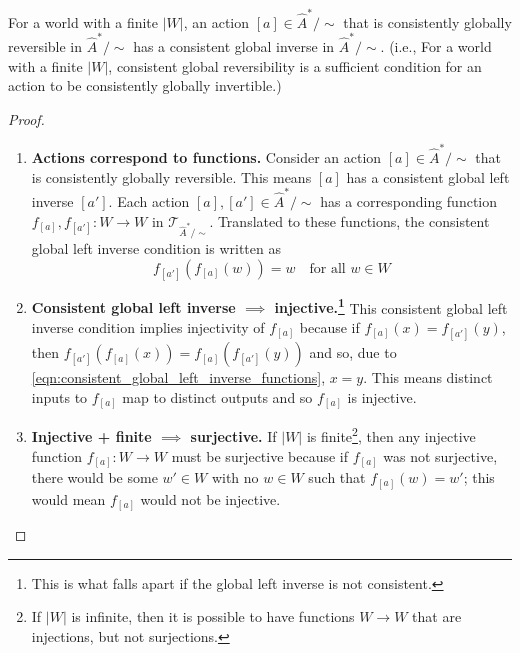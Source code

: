 \begin{proposition}
    For a world with a finite $|W|$, an action $[a] \in \hat{A}^{*}/\sim$ that is consistently globally reversible in $\hat{A}^{*}/\sim$ has a consistent global inverse in $\hat{A}^{*}/\sim$.
    (i.e., For a world with a finite $|W|$, consistent global reversibility is a sufficient condition for an action to be consistently globally invertible.)
\end{proposition}
\begin{proof}
    \begin{enumerate}[(1)]
    \item \textbf{Actions correspond to functions.}
    Consider an action $[a] \in \hat{A}^{*}/\sim$ that is consistently globally reversible.
    This means $[a]$ has a consistent global left inverse $[a']$.
    Each action $[a], [a'] \in \hat{A}^{*}/\sim$ has a corresponding function $f_{[a]}, f_{[a']}: W \to W$ in $\mathcal{T}_{\hat{A}^{*}/\sim}$.
    Translated to these functions, the consistent global left inverse condition is written as
    \begin{equation}
        \label{eqn:consistent_global_left_inverse_functions}
        f_{[a']}(f_{[a]}(w)) = w \quad \text{for all $w \in W$}
    \end{equation}

    \item \textbf{Consistent global left inverse $\implies$ injective.\footnote{This is what falls apart if the global left inverse is not consistent.}}
    This consistent global left inverse condition implies injectivity of $f_{[a]}$ because if $f_{[a]}(x) = f_{[a']}(y)$, then $f_{[a']}(f_{[a]}(x)) = f_{[a]}(f_{[a']}(y))$ and so, due to \cref{eqn:consistent_global_left_inverse_functions}, $x = y$.
    This means distinct inputs to $f_{[a]}$ map to distinct outputs and so $f_{[a]}$ is injective.

    \item \textbf{Injective + finite $\implies$ surjective.}
    If $|W|$ is finite\footnote{
    If $|W|$ is infinite, then it is possible to have functions $W \to W$ that are injections, but not surjections. 
    }, then any injective function $f_{[a]}: W \to W$ must be surjective because if $f_{[a]}$ was not surjective, there would be some $w' \in W$ with no $w \in W$ such that $f_{[a]}(w) = w'$; this would mean $f_{[a]}$ would not be injective.


\end{enumerate}
\end{proof}
